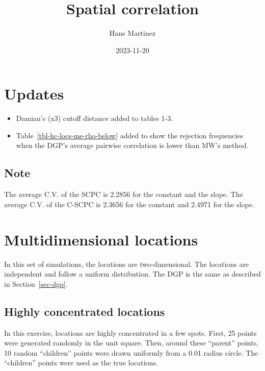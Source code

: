 \documentclass[
]{article}
\title{Spatial correlation}
\author{Hans Martinez}
\date{2023-11-20}
\providecommand{\tightlist}{%
  \setlength{\itemsep}{0pt}\setlength{\parskip}{0pt}}\usepackage{longtable,booktabs,array}
\begin{document}
\maketitle
\ifdefined\Shaded\renewenvironment{Shaded}{\begin{tcolorbox}[frame hidden, interior hidden, borderline west={3pt}{0pt}{shadecolor}, boxrule=0pt, enhanced, breakable, sharp corners]}{\end{tcolorbox}}\fi

\hypertarget{updates}{%
\section*{Updates}\label{updates}}

\begin{itemize}
\tightlist
\item
  Damian's (x3) cutoff distance added to tables 1-3.
\item
  Table~\ref{tbl-hc-locs-me-rho-below} added to show the rejection
  frequencies when the DGP's average pairwise correlation is lower than
  MW's method.
\end{itemize}

\hypertarget{note}{%
\subsection*{Note}\label{note}}

The average C.V. of the SCPC is 2.2856 for the constant and the slope.
The average C.V. of the C-SCPC is 2.3656 for the constant and 2.4971 for
the slope.

\hypertarget{sec-multi}{%
\section{Multidimensional locations}\label{sec-multi}}

In this set of simulations, the locations are two-dimensional. The
locations are independent and follow a uniform distribution. The DGP is
the same as described in Section~\ref{sec-dgp}.

\hypertarget{highly-concentrated-locations}{%
\subsection{Highly concentrated
locations}\label{highly-concentrated-locations}}

In this exercise, locations are highly concentrated in a few spots.
First, 25 points were generated randomly in the unit square. Then,
around these ``parent'' points, 10 random ``children'' points were drawn
uniformly from a 0.01 radius circle. The ``children'' points were used
as the true locations.
\end{document}

